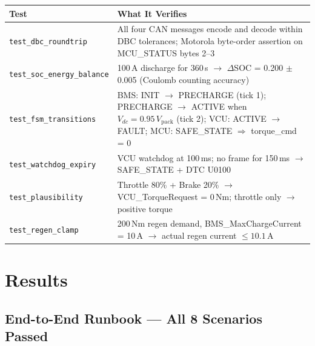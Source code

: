 \documentclass[12pt, a4paper, openany]{report}
\newcommand{\code}[1]{\texttt{#1}}
\begin{document}
\begin{table}[!ht]
\centering\small
\begin{tabularx}{\textwidth}{lX}
  \toprule
  \rowcolor{TblHead}
  \color{white}\textbf{Test} &
  \color{white}\textbf{What It Verifies} \\
  \midrule
  \code{test\_dbc\_roundtrip}
    & All four CAN messages encode and decode within DBC tolerances;
      Motorola byte-order assertion on MCU\_STATUS bytes 2--3 \\
  \rowcolor{TblAlt}
  \code{test\_soc\_energy\_balance}
    & 100\,A discharge for 360\,s $\to$ $\Delta$SOC = 0.200 $\pm$ 0.005
      (Coulomb counting accuracy) \\
  \code{test\_fsm\_transitions}
    & BMS: INIT $\to$ PRECHARGE (tick 1); PRECHARGE $\to$ ACTIVE when
      $V_{dc} = 0.95\,V_\text{pack}$ (tick 2); VCU: ACTIVE $\to$ FAULT;
      MCU: SAFE\_STATE $\Rightarrow$ torque\_cmd = 0 \\
  \rowcolor{TblAlt}
  \code{test\_watchdog\_expiry}
    & VCU watchdog at 100\,ms; no frame for 150\,ms $\to$
      SAFE\_STATE + DTC U0100 \\
  \code{test\_plausibility}
    & Throttle 80\% + Brake 20\% $\to$ VCU\_TorqueRequest = 0\,Nm;
      throttle only $\to$ positive torque \\
  \rowcolor{TblAlt}
  \code{test\_regen\_clamp}
    & 200\,Nm regen demand, BMS\_MaxChargeCurrent = 10\,A $\to$
      actual regen current $\leq 10.1$\,A \\
  \bottomrule
\end{tabularx}
\end{table}

\chapter{Results}

\section{End-to-End Runbook --- All 8 Scenarios Passed}
\end{document}
